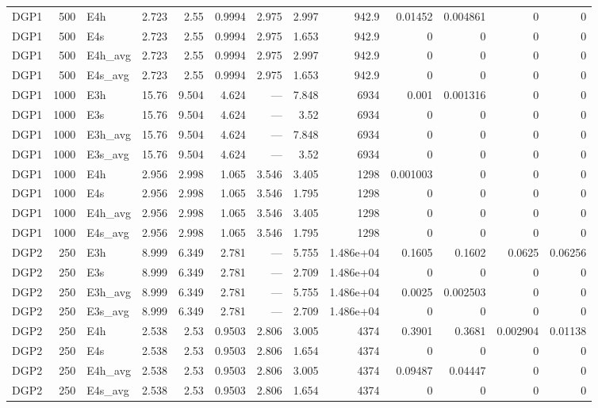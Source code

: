 \begin{tiny}
\begin{longtable}{lrlrrrrrrrrrr}
DGP1 & 500 & E4h & 2.723 & 2.55 & 0.9994 & 2.975 & 2.997 & 942.9 & 0.01452 & 0.004861 & 0 & 0 \\
DGP1 & 500 & E4s & 2.723 & 2.55 & 0.9994 & 2.975 & 1.653 & 942.9 & 0 & 0 & 0 & 0 \\
DGP1 & 500 & E4h_avg & 2.723 & 2.55 & 0.9994 & 2.975 & 2.997 & 942.9 & 0 & 0 & 0 & 0 \\
DGP1 & 500 & E4s_avg & 2.723 & 2.55 & 0.9994 & 2.975 & 1.653 & 942.9 & 0 & 0 & 0 & 0 \\
DGP1 & 1000 & E3h & 15.76 & 9.504 & 4.624 & --- & 7.848 & 6934 & 0.001 & 0.001316 & 0 & 0 \\
DGP1 & 1000 & E3s & 15.76 & 9.504 & 4.624 & --- & 3.52 & 6934 & 0 & 0 & 0 & 0 \\
DGP1 & 1000 & E3h_avg & 15.76 & 9.504 & 4.624 & --- & 7.848 & 6934 & 0 & 0 & 0 & 0 \\
DGP1 & 1000 & E3s_avg & 15.76 & 9.504 & 4.624 & --- & 3.52 & 6934 & 0 & 0 & 0 & 0 \\
DGP1 & 1000 & E4h & 2.956 & 2.998 & 1.065 & 3.546 & 3.405 & 1298 & 0.001003 & 0 & 0 & 0 \\
DGP1 & 1000 & E4s & 2.956 & 2.998 & 1.065 & 3.546 & 1.795 & 1298 & 0 & 0 & 0 & 0 \\
DGP1 & 1000 & E4h_avg & 2.956 & 2.998 & 1.065 & 3.546 & 3.405 & 1298 & 0 & 0 & 0 & 0 \\
DGP1 & 1000 & E4s_avg & 2.956 & 2.998 & 1.065 & 3.546 & 1.795 & 1298 & 0 & 0 & 0 & 0 \\
DGP2 & 250 & E3h & 8.999 & 6.349 & 2.781 & --- & 5.755 & 1.486e+04 & 0.1605 & 0.1602 & 0.0625 & 0.06256 \\
DGP2 & 250 & E3s & 8.999 & 6.349 & 2.781 & --- & 2.709 & 1.486e+04 & 0 & 0 & 0 & 0 \\
DGP2 & 250 & E3h_avg & 8.999 & 6.349 & 2.781 & --- & 5.755 & 1.486e+04 & 0.0025 & 0.002503 & 0 & 0 \\
DGP2 & 250 & E3s_avg & 8.999 & 6.349 & 2.781 & --- & 2.709 & 1.486e+04 & 0 & 0 & 0 & 0 \\
DGP2 & 250 & E4h & 2.538 & 2.53 & 0.9503 & 2.806 & 3.005 & 4374 & 0.3901 & 0.3681 & 0.002904 & 0.01138 \\
DGP2 & 250 & E4s & 2.538 & 2.53 & 0.9503 & 2.806 & 1.654 & 4374 & 0 & 0 & 0 & 0 \\
DGP2 & 250 & E4h_avg & 2.538 & 2.53 & 0.9503 & 2.806 & 3.005 & 4374 & 0.09487 & 0.04447 & 0 & 0 \\
DGP2 & 250 & E4s_avg & 2.538 & 2.53 & 0.9503 & 2.806 & 1.654 & 4374 & 0 & 0 & 0 & 0 \\

\end{longtable}
\end{tiny}
